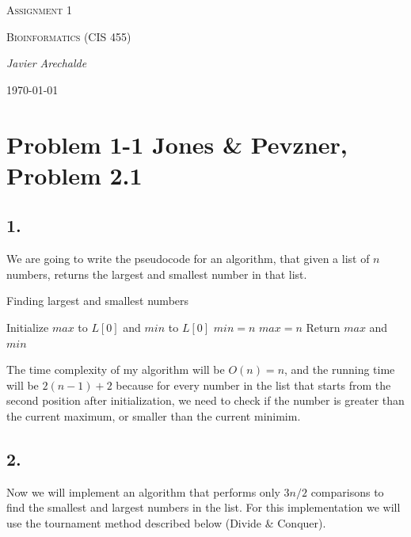 \documentclass{article}
\begin{document}
\begin{titlepage}
	\centering
	{\scshape\LARGE Assignment 1\par}
	\vspace{1cm}
	{\scshape\Large Bioinformatics (CIS 455)\par}
	\vspace{1.5cm}
	{\Large\itshape Javier Arechalde\par}
	\vfill
	{\large \today\par}
\end{titlepage}

\section*{Problem 1-1 Jones \& Pevzner, Problem 2.1}
  
\subsection*{1.}

We are going to write the pseudocode for an algorithm, that given a list of $n$ numbers, returns the largest and smallest number in that list.

\begin{algorithm}[H]
\caption{Finding largest and smallest numbers}
\begin{algorithmic}[1]
\State Initialize $max$ to $L[0]$ and $min$ to $L[0]$
  \State $min = n$
 \EndIf 
  \State $max = n$
 \EndIf
\EndFor
\State Return $max$ and $min$
\end{algorithmic}
\end{algorithm}

The time complexity of my algorithm will be $O(n) = n$, and the running time will be $2(n-1)+2$ because for every number in the list that starts from the second position after initialization, we need to check if the number is greater than the current maximum, or smaller than the current minimim.

\subsection*{2.}

Now we will implement an algorithm that performs only $3n/2$ comparisons to find the smallest and largest numbers in the list. For this implementation we will use the tournament method described below (Divide \& Conquer).
\end{document}
